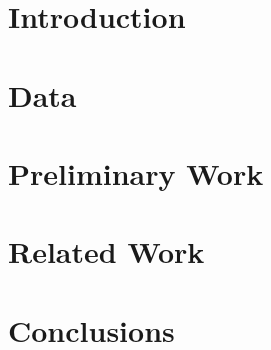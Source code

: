 \documentclass{sig-alternate}
\begin{document}


\section{Introduction}

\section{Data}

\section{Preliminary Work}

\section{Related Work}

\section{Conclusions}



\end{document}
